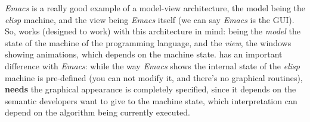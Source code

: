 \documentclass{article}
\begin{document}
\textit{Emacs} is a really good example of a model-view architecture, the model
being the \textit{elisp} machine, and the view being \textit{Emacs} itself (we
can say \textit{Emacs} is the GUI). So, \fav works (designed to work) with this
architecture in mind: being the \textit{model} the state of the machine of the
programming language, and the \textit{view}, the windows showing animations,
which depends on the machine state. \fav has an important difference with
\textit{Emacs}: while the way \textit{Emacs} shows the internal state
of the \textit{elisp} machine is pre-defined (you can not modify it, and there's
no graphical routines), \fav \textbf{needs} the graphical appearance is
completely specified, since it depends on the semantic developers want to give
to the machine state, which interpretation can depend on the algorithm being
currently executed.
\end{document}
